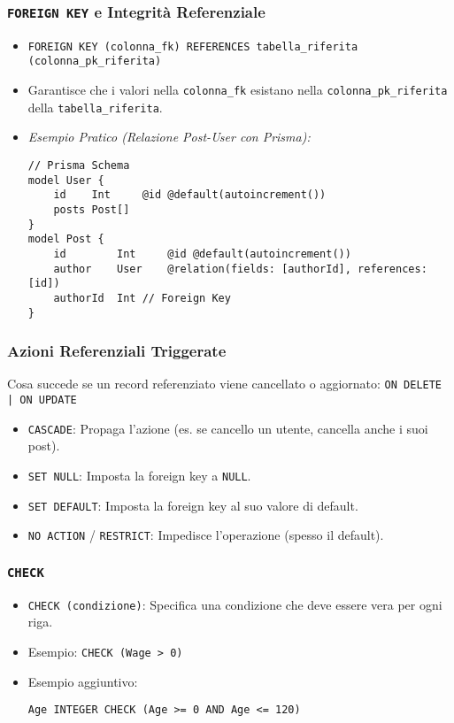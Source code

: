 	\subsubsection{\texttt{FOREIGN KEY} e Integrità Referenziale}
	\begin{itemize}
		\item \texttt{FOREIGN KEY (colonna\_fk) REFERENCES tabella\_riferita (colonna\_pk\_riferita)}
		\item Garantisce che i valori nella \texttt{colonna\_fk} esistano nella \texttt{colonna\_pk\_riferita} della \texttt{tabella\_riferita}.
		\item \textit{Esempio Pratico (Relazione Post-User con Prisma):}
		\begin{verbatim}
// Prisma Schema
model User {
	id    Int     @id @default(autoincrement())
	posts Post[]
}
model Post {
	id        Int     @id @default(autoincrement())
	author    User    @relation(fields: [authorId], references: [id])
	authorId  Int // Foreign Key
}
		\end{verbatim}
	\end{itemize}
	\subsubsection{Azioni Referenziali Triggerate}
	Cosa succede se un record referenziato viene cancellato o aggiornato: \texttt{ON DELETE | ON UPDATE}
	\begin{itemize}
		\item \texttt{CASCADE}: Propaga l'azione (es. se cancello un utente, cancella anche i suoi post).
		\item \texttt{SET NULL}: Imposta la foreign key a \texttt{NULL}.
		\item \texttt{SET DEFAULT}: Imposta la foreign key al suo valore di default.
		\item \texttt{NO ACTION} / \texttt{RESTRICT}: Impedisce l'operazione (spesso il default).
	\end{itemize}
	\subsubsection{\texttt{CHECK}}
	\begin{itemize}
		\item \texttt{CHECK (condizione)}: Specifica una condizione che deve essere vera per ogni riga.
		\item Esempio: \texttt{CHECK (Wage > 0)}
		\item Esempio aggiuntivo:
		\begin{verbatim}
Age INTEGER CHECK (Age >= 0 AND Age <= 120)
		\end{verbatim}
	\end{itemize}
	
